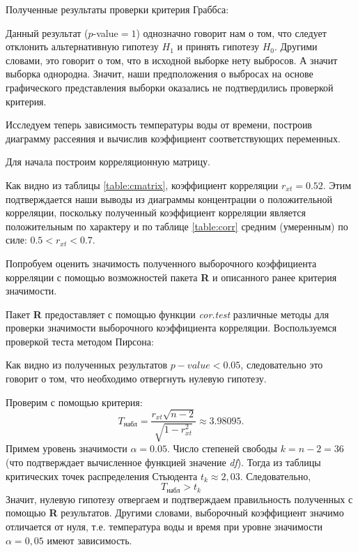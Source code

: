 Полученные результаты проверки критерия Граббса:

Данный результат ($p$-value$ = 1$) однозначно говорит нам о том, что следует отклонить альтернативную гипотезу $H_{1}$ и принять гипотезу $H_{0}$. Другими словами, это говорит о том, что в исходной выборке нету выбросов. А значит выборка однородна. Значит, наши предположения о выбросах на основе графического представления выборки оказались не подтвердились проверкой критерия.

Исследуем теперь зависимость температуры воды от времени, построив диаграмму рассеяния и вычислив коэффициент соответствующих переменных.

Для начала построим корреляционную матрицу.

Как видно из таблицы \ref{table:cmatrix}, коэффициент корреляции $r_{xt}=0.52$. Этим подтверждается наши выводы из диаграммы концентрации о положительной корреляции, поскольку полученный коэффициент корреляции является положительным по характеру и по таблице \ref{table:corr} средним (умеренным) по силе: $0.5 < r_{xt} < 0.7$.

Попробуем оценить значимость полученного выборочного коэффициента корреляции с помощью возможностей пакета \textbf{R} и описанного ранее критерия значимости.

Пакет \textbf{R} предоставляет с помощью функции \textit{cor.test} различные методы для проверки значимости выборочного коэффициента корреляции. Воспользуемся проверкой теста методом Пирсона:

Как видно из полученных результатов $p-value < 0.05$, следовательно это говорит о том, что необходимо отвергнуть нулевую гипотезу.

Проверим с помощью критерия:
\begin{equation*}
	T_{\textrm{набл}} = \frac{r_{xt} \sqrt{n - 2}}{\sqrt{1 - r_{xt}^2}} \approx 3.98095.
\end{equation*}
Примем уровень значимости $\alpha = 0.05$. Число степеней свободы $k = n - 2 = 36$ (что подтверждает вычисленное функцией значение \textit{df}). Тогда из таблицы критических точек распределения Стьюдента $t_k \approx 2,03$. Следовательно,
\begin{equation*}
	T_{\textrm{набл}} > t_k	
\end{equation*}
Значит, нулевую гипотезу отвергаем и подтверждаем правильность полученных с помощью \textbf{R} результатов. Другими словами, выборочный коэффициент значимо отличается от нуля, т.е. температура воды и время при уровне значимости $\alpha = 0,05$ имеют зависимость.

